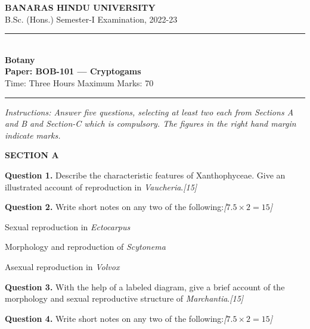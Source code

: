 \documentclass[11pt,a4paper]{article}
\newcommand{\pts}[1]{\hfill   \textit{[#1]}}
\begin{document}
\begin{center}
  {\large\bfseries BANARAS HINDU UNIVERSITY}\\[2pt]
  {\normalsize B.Sc. (Hons.) Semester-I Examination, 2022-23}\\[6pt]
  \rule{0.8\linewidth}{0.5pt}\\[6pt]
  {\large\bfseries Botany}\\[4pt]
  {\large\bfseries Paper: BOB-101 --- Cryptogams}\\[4pt]
  {\normalsize Time: Three Hours \hfill Maximum Marks: 70}
\end{center}

\rule{\linewidth}{0.4pt}

\smallskip



\noindent   \textit{Instructions: Answer five questions, selecting at least two each from Sections A and B and Section-C which is compulsory. The figures in the right hand margin indicate marks.}

\bigskip


\begin{center}
   \textbf{SECTION A}
\end{center}
\medskip

\medskip


\noindent   \textbf{Question 1.} Describe the characteristic features of Xanthophyceae. Give an illustrated account of reproduction in   \textit{Vaucheria}.\pts{15}

\medskip


\noindent   \textbf{Question 2.} Write short notes on any two of the following:\pts{$7.5  \times 2 = 15$}

\begin{parts}
  \item Sexual reproduction in   \textit{Ectocarpus}
  \item Morphology and reproduction of   \textit{Scytonema}
  \item Asexual reproduction in   \textit{Volvox}
\end{parts}

\medskip


\noindent   \textbf{Question 3.} With the help of a labeled diagram, give a brief account of the morphology and sexual reproductive structure of   \textit{Marchantia}.\pts{15}

\medskip


\noindent   \textbf{Question 4.} Write short notes on any two of the following:\pts{$7.5  \times 2 = 15$}
\end{document}
